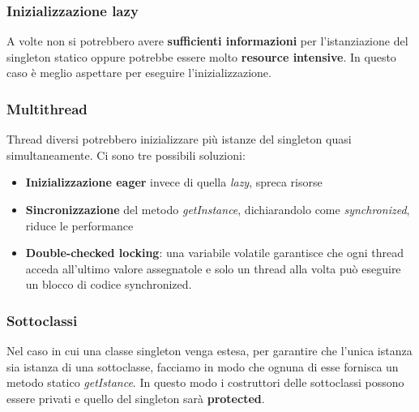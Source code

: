 \subsubsection{Inizializzazione lazy} A volte non si potrebbero avere \textbf{sufficienti informazioni} per l'istanziazione del singleton statico oppure potrebbe essere molto \textbf{resource intensive}. In questo caso è meglio aspettare per eseguire l'inizializzazione.

\subsubsection{Multithread} Thread diversi potrebbero inizializzare più istanze del singleton quasi simultaneamente. Ci sono tre possibili soluzioni:
\begin{itemize}
	\item \textbf{Inizializzazione eager} invece di quella \textit{lazy}, spreca risorse
	\item \textbf{Sincronizzazione} del metodo \textit{getInstance}, dichiarandolo come \textit{synchronized}, riduce le performance
	\item \textbf{Double-checked locking}: una variabile volatile garantisce che ogni thread acceda all'ultimo valore assegnatole e solo un thread alla volta può eseguire un blocco di codice synchronized.
\end{itemize}

\subsubsection{Sottoclassi}
Nel caso in cui una classe singleton venga estesa, per garantire che l'unica istanza sia istanza di una sottoclasse, facciamo in modo che ognuna di esse fornisca un metodo statico \textit{getIstance}. In questo modo i costruttori delle sottoclassi possono essere privati e quello del singleton sarà \textbf{protected}.

